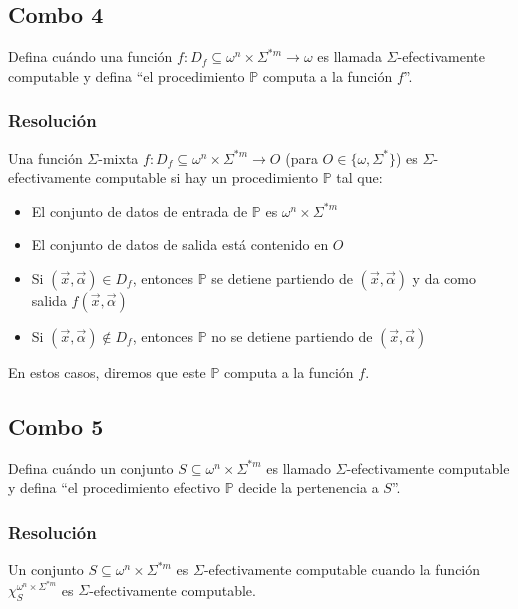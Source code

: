 \documentclass[
]{article}
\providecommand{\tightlist}{%
  \setlength{\itemsep}{0pt}\setlength{\parskip}{0pt}}
\begin{document}
\subsection{Combo 4}\label{combo-4}

Defina cuándo una función
\(f:D_f\subseteq\omega^n\times\Sigma^{*m}\to\omega\) es llamada
\(\Sigma\)-efectivamente computable y defina ``el procedimiento
\(\mathbb{P}\) computa a la función \(f\)''.

\subsubsection{Resolución}\label{resoluciuxf3n-3}

Una función \(\Sigma\)-mixta
\(f:D_f\subseteq\omega^n\times\Sigma^{*m}\to O\) (para
\(O\in\{\omega,\Sigma^*\}\)) es \(\Sigma\)-efectivamente computable si
hay un procedimiento \(\mathbb{P}\) tal que:

\begin{itemize}
\tightlist
\item
  El conjunto de datos de entrada de \(\mathbb{P}\) es
  \(\omega^n\times\Sigma^{*m}\)
\item
  El conjunto de datos de salida está contenido en \(O\)
\item
  Si \((\vec{x},\vec{\alpha})\in D_f\), entonces \(\mathbb{P}\) se
  detiene partiendo de \((\vec{x},\vec{\alpha})\) y da como salida
  \(f(\vec{x},\vec{\alpha})\)
\item
  Si \((\vec{x},\vec{\alpha})\notin D_f\), entonces \(\mathbb{P}\) no se
  detiene partiendo de \((\vec{x},\vec{\alpha})\)
\end{itemize}

En estos casos, diremos que este \(\mathbb{P}\) computa a la función
\(f\).

\subsection{Combo 5}\label{combo-5}

Defina cuándo un conjunto \(S\subseteq\omega^n\times\Sigma^{*m}\) es
llamado \(\Sigma\)-efectivamente computable y defina ``el procedimiento
efectivo \(\mathbb{P}\) decide la pertenencia a \(S\)''.

\subsubsection{Resolución}\label{resoluciuxf3n-4}

Un conjunto \(S\subseteq\omega^n\times\Sigma^{*m}\) es
\(\Sigma\)-efectivamente computable cuando la función
\(\chi_S^{\omega^n\times\Sigma^{*m}}\) es \(\Sigma\)-efectivamente
computable.
\end{document}
